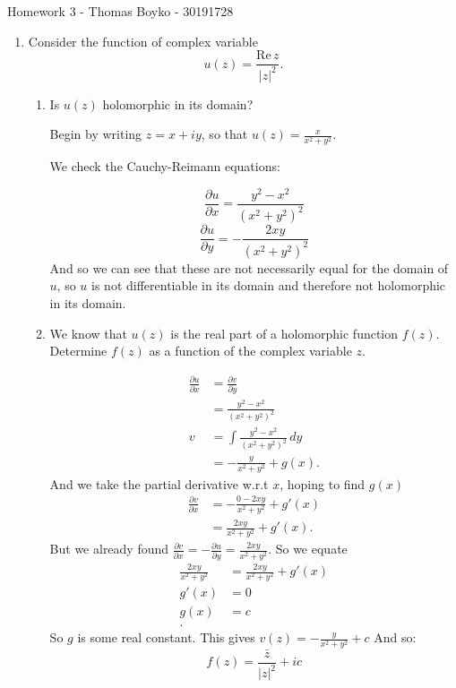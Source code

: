 \documentclass{article}
\begin{document}
    \huge Homework 3 - Thomas Boyko - 30191728
    \normalsize
\begin{enumerate} 

    \item Consider the function of complex variable
        \[
        u(z)= \frac{\mathrm{Re}\,z}{|z|^2}
        .\] 

\begin{enumerate}[label= (\alph*)] 
    \item  Is $u (z)$ holomorphic in its domain?

        Begin by writing $z=x+iy$, so that $u(z)=\frac{x}{x^2+y^2}$.

        We check the Cauchy-Reimann equations:

        $$\frac{\partial u}{\partial x} =\frac{y^2-x^2}{(x^2+y^2)^2}$$
        $$\frac{\partial u}{\partial y} =-\frac{2xy}{(x^2+y^2)^2}$$
        And so we can see that these are not necessarily equal for the domain of $u$, so 
        $u$ is not differentiable in its domain and therefore not holomorphic in its domain.

    \item We know that $u (z)$ is the real part of a holomorphic function
        $f (z)$. Determine $f (z)$ as a function of the complex variable $z$.

        \begin{align*}
        \frac{\partial u}{\partial x} &= \frac{\partial v}{\partial y}  \\
                                      &=\frac{y^2-x^2}{(x^2+y^2)^2}\\
                        v&=\int  \frac{y^2-x^2}{(x^2+y^2)^2} \, dy\\
                        &= -\frac{y}{x^2+y^2}+g(x)
        .\end{align*}
        And we take the partial derivative w.r.t $x$, hoping to find $g(x)$
        \begin{align*}
                \frac{\partial v}{\partial x} &= -\frac{0-2xy}{x^2+y^2}+g'(x) \\
                &= \frac{2xy}{x^2+y^2} +g'(x)
        .\end{align*}
        But we already found 
        $\frac{\partial v}{\partial x}=-\frac{\partial u}{\partial y} =\frac{2xy}{x^2+y^2}$.
        So we equate
        \begin{align*}
            \frac{2xy}{x^2+y^2}&= \frac{2xy}{x^2+y^2} +g'(x)\\
            g'(x)&= 0 \\
            g(x)&= c \\
        .\end{align*}
        So $g$ is some real constant. This gives $v(z)=-\frac{y}{x^2+y^2}+c$
        And so:
        $$f(z)=\frac{\bar{z}}{|z|^2}+ic$$


\end{enumerate}
\end{enumerate}
\end{document}
